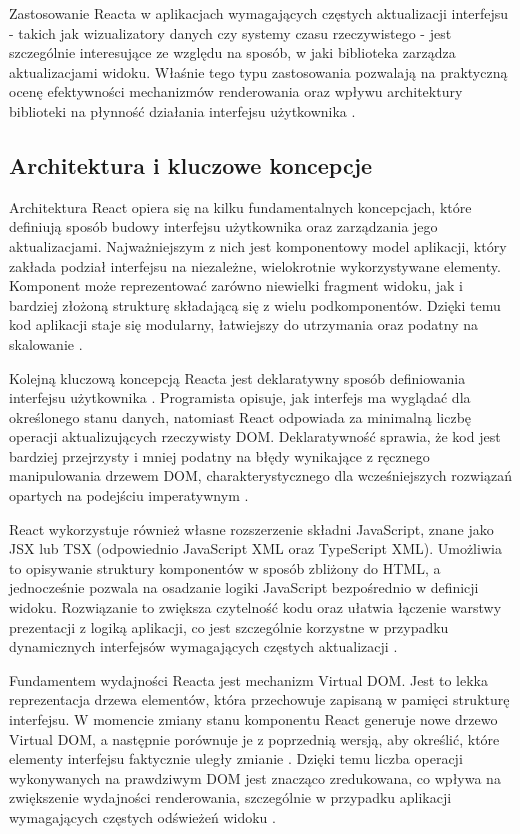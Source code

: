 \documentclass[12pt,openright,twoside]{report}
\begin{document}
Zastosowanie Reacta w aplikacjach wymagających częstych aktualizacji interfejsu - takich jak wizualizatory danych czy systemy czasu rzeczywistego - jest szczególnie interesujące ze względu na sposób, w jaki biblioteka zarządza aktualizacjami widoku. Właśnie tego typu zastosowania pozwalają na praktyczną ocenę efektywności mechanizmów renderowania oraz wpływu architektury biblioteki na płynność działania interfejsu użytkownika \cite{React_Up_Running}.

\subsection{Architektura i kluczowe koncepcje}
Architektura React opiera się na kilku fundamentalnych koncepcjach, które definiują sposób budowy interfejsu użytkownika oraz zarządzania jego aktualizacjami. Najważniejszym z nich jest komponentowy model aplikacji, który zakłada podział interfejsu na niezależne, wielokrotnie wykorzystywane elementy. Komponent może reprezentować zarówno niewielki fragment widoku, jak i bardziej złożoną strukturę składającą się z wielu podkomponentów. Dzięki temu kod aplikacji staje się modularny, łatwiejszy do utrzymania oraz podatny na skalowanie \cite{Design_Patterns_JS}.

Kolejną kluczową koncepcją Reacta jest deklaratywny sposób definiowania interfejsu użytkownika \cite{React_Up_Running}. Programista opisuje, jak interfejs ma wyglądać dla określonego stanu danych, natomiast React odpowiada za minimalną liczbę operacji aktualizujących rzeczywisty DOM. Deklaratywność sprawia, że kod jest bardziej przejrzysty i mniej podatny na błędy wynikające z ręcznego manipulowania drzewem DOM, charakterystycznego dla wcześniejszych rozwiązań opartych na podejściu imperatywnym \cite{Learning_React_Third}.

React wykorzystuje również własne rozszerzenie składni JavaScript, znane jako JSX lub TSX (odpowiednio JavaScript XML oraz TypeScript XML). Umożliwia to opisywanie struktury komponentów w sposób zbliżony do HTML, a jednocześnie pozwala na osadzanie logiki JavaScript bezpośrednio w definicji widoku. Rozwiązanie to zwiększa czytelność kodu oraz ułatwia łączenie warstwy prezentacji z logiką aplikacji, co jest szczególnie korzystne w przypadku dynamicznych interfejsów wymagających częstych aktualizacji \cite{React_Official}.

Fundamentem wydajności Reacta jest mechanizm Virtual DOM. Jest to lekka reprezentacja drzewa elementów, która przechowuje zapisaną w pamięci strukturę interfejsu. W momencie zmiany stanu komponentu React generuje nowe drzewo Virtual DOM, a następnie porównuje je z poprzednią wersją, aby określić, które elementy interfejsu faktycznie uległy zmianie \cite{Learn_React_Design}. Dzięki temu liczba operacji wykonywanych na prawdziwym DOM jest znacząco zredukowana, co wpływa na zwiększenie wydajności renderowania, szczególnie w przypadku aplikacji wymagających częstych odświeżeń widoku \cite{VDOM_Efficiency}.
\end{document}
